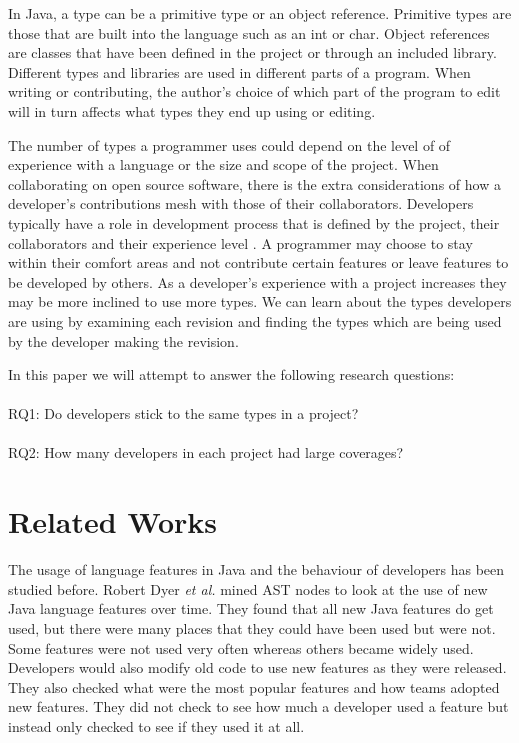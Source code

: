 \documentclass{sig-alternate-05-2015}
\begin{document}
In Java, a type can be a primitive type or an object reference. Primitive types are those that are built into the language such as an int or char. Object references are classes that have been defined in the project or through an included library. Different types and libraries are used in different parts of a program. When writing or contributing, the author's choice of which part of the program to edit will in turn affects what types they end up using or editing. 

The number of types a programmer uses could depend on the level of of experience with a language or the size and scope of the project. When collaborating on open source software, there is the extra considerations of how a developer's contributions mesh with those of their collaborators. Developers typically have a role in development process that is defined by the project, their collaborators and their experience level \cite{Patrick:Wagstrom:2012}. A programmer may choose to stay within their comfort areas and not contribute certain features or leave features to be developed by others. As a developer's experience with a project increases they may be more inclined to use more types.
We can learn about the types developers are using by examining each revision and finding the types which are being used by the developer making the revision.

In this paper we will attempt to answer the following research questions: \\ \\
RQ1: Do developers stick to the same types in a project? \\ \\
RQ2: How many developers in each project had large coverages?


\section{Related Works}
The usage of language features in Java and the behaviour of developers has been studied before. 
Robert Dyer \textit{et al.} \cite{Dyer:2014:MBA:2568225.2568295} mined AST nodes to look at the use of new Java language features over time. They found that all new Java features do get used, but there were many places that they could have been used but were not. Some features were not used very often whereas others became widely used. Developers would also modify old code to use new features as they were released. They also checked what were the most popular features and how teams adopted new features. They did not check to see how much a developer used a feature but instead only checked to see if they used it at all.
\end{document}
